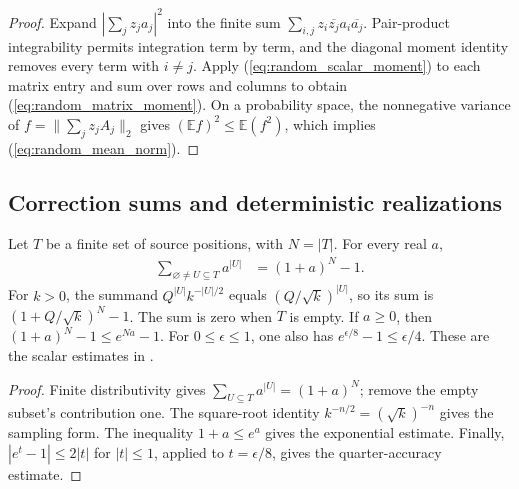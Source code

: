 \begin{proof}\leanok
    Expand $|\sum_j z_j a_j|^2$ into the finite sum
    $\sum_{i,j}z_i\overline{z_j}a_i\overline{a_j}$.
    Pair-product integrability permits integration term by term, and the
    diagonal moment identity removes every term with $i\neq j$.
    Apply (\ref{eq:random_scalar_moment}) to each matrix entry and sum over
    rows and columns to obtain (\ref{eq:random_matrix_moment}).
    On a probability space, the nonnegative variance of
    $f=\lVert\sum_j z_j A_j\rVert_2$ gives
    $(\mathbb E f)^2\leq\mathbb E(f^2)$, which implies
    (\ref{eq:random_mean_norm}).
\end{proof}

\subsection{Correction sums and deterministic realizations}

\begin{theorem}\label{thm:random_binomial_cost}
    \leanok
    Let $T$ be a finite set of source positions, with $N=|T|$. For every real
    $a$,
    \begin{align}
        \sum_{\varnothing\neq U\subseteq T}a^{|U|}
         & =(1+a)^N-1.
        \label{eq:random_binomial_cost}
    \end{align}
    For $k>0$, the summand $Q^{|U|}k^{-|U|/2}$ equals
    $(Q/\sqrt{k})^{|U|}$, so its sum is
    $(1+Q/\sqrt{k})^N-1$. The sum is zero when $T$ is empty.
    If $a\geq0$, then $(1+a)^N-1\leq e^{Na}-1$.
    For $0\leq\epsilon\leq1$, one also has
    $e^{\epsilon/8}-1\leq\epsilon/4$.
    These are the scalar estimates in
    \cite[Equation~(5.19) and the following paragraph]{OpenAI2026PolynomialPEPS}.
\end{theorem}

\begin{proof}\leanok
    Finite distributivity gives
    $\sum_{U\subseteq T}a^{|U|}=(1+a)^N$; remove the empty subset's contribution
    one. The square-root identity $k^{-n/2}=(\sqrt{k})^{-n}$ gives the
    sampling form. The inequality $1+a\leq e^a$ gives the exponential
    estimate. Finally, $|e^t-1|\leq2|t|$ for $|t|\leq1$, applied to
    $t=\epsilon/8$, gives the quarter-accuracy estimate.
\end{proof}

